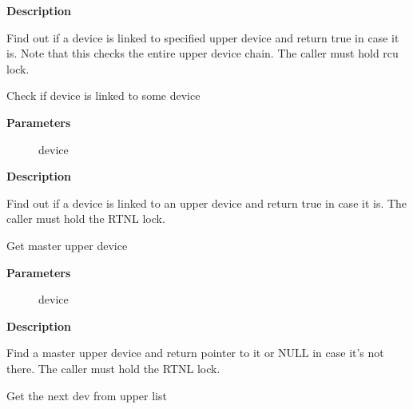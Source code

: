 \documentclass[a4paper,8pt,english]{sphinxmanual}
\begin{document}
\textbf{Description}

Find out if a device is linked to specified upper device and return true
in case it is. Note that this checks the entire upper device chain.
The caller must hold rcu lock.

\begin{fulllineitems}
\label{networking/kapi:c.netdev_has_any_upper_dev}
Check if device is linked to some device

\end{fulllineitems}


\textbf{Parameters}
\begin{description}
\item[{}] \leavevmode
device

\end{description}

\textbf{Description}

Find out if a device is linked to an upper device and return true in case
it is. The caller must hold the RTNL lock.

\begin{fulllineitems}
\label{networking/kapi:c.netdev_master_upper_dev_get}
Get master upper device

\end{fulllineitems}


\textbf{Parameters}
\begin{description}
\item[{}] \leavevmode
device

\end{description}

\textbf{Description}

Find a master upper device and return pointer to it or NULL in case
it's not there. The caller must hold the RTNL lock.

\begin{fulllineitems}
\label{networking/kapi:c.netdev_upper_get_next_dev_rcu}
Get the next dev from upper list

\end{fulllineitems}
\end{document}
